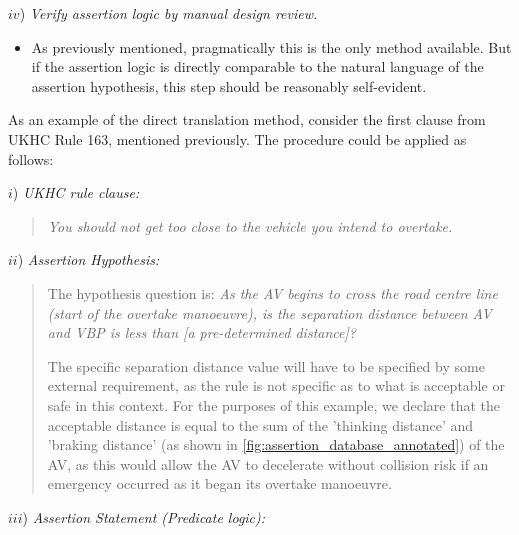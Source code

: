     \noindent $iv$) \emph{Verify assertion logic by manual design review.} %
    \begin{itemize}
    	\item As previously mentioned, pragmatically this is the only method available. But if the assertion logic is directly comparable to the  natural language of the assertion hypothesis, this step should be reasonably self-evident.
    \end{itemize}
    

As an example of the direct translation method, consider the first clause from UKHC Rule 163, mentioned previously. The procedure could be applied as follows:

\noindent $i$) \emph{UKHC rule clause:}
	    \begin{quote}
			\textit{You should not get too close to the vehicle you intend to overtake.}
		\end{quote}
\noindent $ii$) \emph{Assertion Hypothesis:}
        \begin{quote}
        	The hypothesis question is: \textit{As the AV begins to cross the road centre line (start of the overtake manoeuvre), is the separation distance between AV and VBP is less than [a pre-determined distance]?} 
        	
        	The specific separation distance value will have to be specified by some external requirement, as the rule is not specific as to what is acceptable or safe in this context. For the purposes of this example, we declare that the acceptable distance is equal to the sum of the 'thinking distance' and 'braking distance' (as shown in \ref{fig:assertion_database_annotated}) of the AV, as this would allow the AV to decelerate without collision risk if an emergency occurred as it began its overtake manoeuvre.
        \end{quote}
\noindent $iii$) \emph{Assertion Statement (Predicate logic):}

